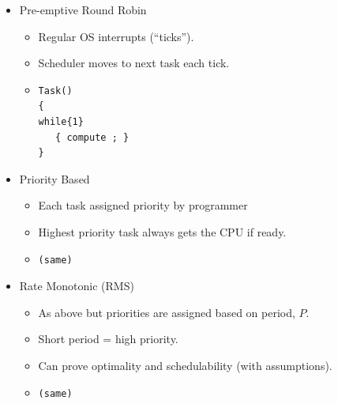 \begin{itemize}	%

        \item	%
Pre-emptive Round Robin
        \begin{itemize}
                \item Regular OS interrupts (``ticks'').
                \item Scheduler moves to next task each tick.
                \item \begin{verbatim}
Task()
{
while{1}
   { compute ; }
}
\end{verbatim}
        \end{itemize}


     \item	%
Priority Based
        \begin{itemize}
                \item Each task assigned priority by programmer
                \item Highest priority task always gets the CPU if
ready.                \item \begin{verbatim}
(same)
\end{verbatim}
        \end{itemize}



        \item	%
 Rate Monotonic (RMS)
        \begin{itemize}
                \item As above but priorities are assigned based on
                period, $P$.
                \item Short period = high priority.
                \item Can prove optimality and schedulability (with
assumptions).      
                \item \begin{verbatim}
(same)
\end{verbatim}
        \end{itemize}



\end{itemize}

